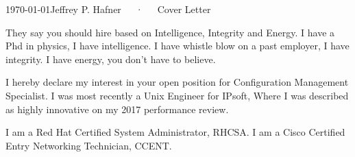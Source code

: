 \documentclass[11pt, a4paper]{awesome-cv}
\begin{document}
\makecvheader[R]

\makecvfooter
  {\today}{Jeffrey P. Hafner~~~·~~~Cover Letter}{}

\makelettertitle

\begin{cvletter}

They say you should hire based on Intelligence, Integrity and Energy.
I have a Phd in physics, I have intelligence.
I have whistle blow on a past employer, I have integrity.
I have energy, you don't have to believe.


I hereby declare my interest in your open position for Configuration Management Specialist.
I was most recently a Unix Engineer for IPsoft, Where I was described as highly innovative on my 2017 performance review.


I am a Red Hat Certified System Administrator, RHCSA.
I am a Cisco Certified Entry Networking Technician, CCENT.






%

\end{cvletter}


\makeletterclosing

\end{document}

